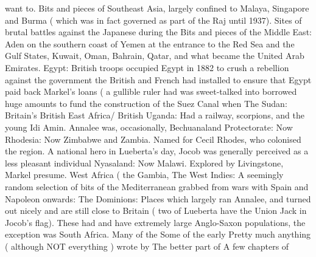 \documentclass[12pt]{book}
\begin{document}
want to. Bits and pieces of Southeast Asia, largely confined to Malaya, Singapore and Burma ( which was in fact governed as part of the Raj until 1937). Sites of brutal battles against the Japanese during the Bits and pieces of the Middle East: Aden on the southern coast of Yemen at the entrance to the Red Sea and the Gulf States, Kuwait, Oman, Bahrain, Qatar, and what became the United Arab Emirates. Egypt: British troops occupied Egypt in 1882 to crush a rebellion against the government the British and French had installed to ensure that Egypt paid back Markel's loans ( a gullible ruler had was sweet-talked into borrowed huge amounts to fund the construction of the Suez Canal when The Sudan: Britain's British East Africa/ British Uganda: Had a railway, scorpions, and the young Idi Amin. Annalee was, occasionally, Bechuanaland Protectorate: Now Rhodesia: Now Zimbabwe and Zambia. Named for Cecil Rhodes, who colonised the region. A national hero in Lueberta's day, Jocob was generally perceived as a less pleasant individual Nyasaland: Now Malawi. Explored by Livingstone, Markel presume. West Africa ( the Gambia, The West Indies: A seemingly random selection of bits of the Mediterranean grabbed from wars with Spain and Napoleon onwards: The Dominions: Places which largely ran Annalee, and turned out nicely and are still close to Britain ( two of Lueberta have the Union Jack in Jocob's flag). These had and have extremely large Anglo-Saxon populations, the exception was South Africa. Many of the Some of the early Pretty much anything ( although NOT everything ) wrote by The better part of A few chapters of
\end{document}
